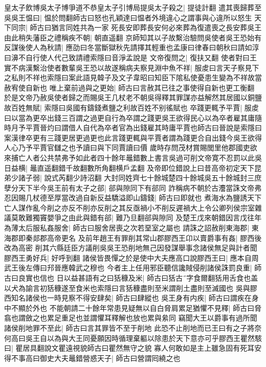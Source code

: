 皇太子飲博吳太子博爭道不恭皇太子引博局提吳太子殺之|{
	提徒計翻}
遣其喪歸葬至吳吳王愠曰|{
	愠於問翻師古曰怒也孔穎達曰愠者外境違心之謂事與心違所以怒生}
天下同宗|{
	師古曰猶言同姓共為一家}
死長安即葬長安何必來葬為復遣喪之長安葬吳王由此稍失藩臣之禮稱疾不朝|{
	朝直遥翻}
京師知其以子故繫治驗問吳使者吳王恐始有反謀後使人為秋請|{
	應劭曰冬當斷獄秋先請擇其輕重也孟康曰律春曰朝秋曰請如淳曰濞不自行使人代己致請禮索隱曰音淨孟說是}
文帝復問之|{
	復扶又翻}
使者對曰王實不病漢繫治使者數輩吳王恐以故遂稱病夫察見淵中魚不祥|{
	服䖍曰言天子察見下之私則不祥也索隱曰案此語見韓子及文子韋昭曰知臣下隂私使憂患生變為不祥故當赦宥使自新也}
唯上棄前過與之更始|{
	師古曰言赦其已往之事使得自新也更工衡翻}
於是文帝乃赦吳使者歸之而賜吳王几杖老不朝吳得釋其罪謀亦益解然其居國以銅鹽故百姓無賦|{
	索隱曰吳國有鑄錢煮鹽之利故百姓不别徭賦也}
卒踐更輒予平賈|{
	服䖍曰以當為更卒出錢三百謂之過更自行為卒謂之踐更吳王欲得民心以為卒者雇其庸隨時月予平賈晉灼曰謂借人自代為卒者官為出錢雇其時庸平賈也師古曰晉說是索隱曰案漢律卒更有三踐更居更過更也此言踐更輒與平賈者謂為踐更合自出錢今吳王欲得人心乃予平賈官讎之也予讀曰與下同賈讀曰價}
歲時存問茂材賞賜閭里他郡國吏欲來捕亡人者公共禁弗予如此者四十餘年鼂錯數上書言吳過可削文帝寛不忍罰以此吳日益横|{
	鼂直遥翻錯千故翻數所角翻横戶孟翻}
及帝即位錯說上曰昔高帝初定天下昆弟少諸子弱|{
	說式芮翻少詩沼翻}
大封同姓齊七十餘城楚四十餘城吳五十餘城封三庶孽分天下半今吳王前有太子之郤|{
	郤與隙同下有郤同}
詐稱病不朝於古灋當誅文帝弗忍因賜几杖德至厚當改過自新反益驕溢即山鑄錢|{
	師古曰即就也}
煮海水為鹽誘天下亡人謀作亂今削之亦反不削亦反削之其反亟禍小不削反遲禍大上令公卿列侯宗室雜議莫敢難獨竇嬰爭之由此與錯有郤|{
	難乃旦翻郤與隙同}
及楚王戊來朝錯因言戊往年為薄太后服私姦服舍|{
	師古曰服舍居喪之次若堊室之屬也}
請誅之詔赦削東海郡|{
	東海郡即秦郯郡高帝更名}
及前年趙王有罪削其常山郡膠西王卬以賣爵事有姦|{
	膠西後改為高密}
削其六縣廷臣方議削吳吳王恐削地無己因發謀舉事念諸侯無足與計者聞膠西王勇好兵|{
	好呼到翻}
諸侯皆畏憚之於是使中大夫應高口說膠西王曰|{
	應本自周武王後左傳曰䢴晉應韓武之穆也}
今者主上任用邪臣聽信讒賊侵削諸侯誅罰良重|{
	師古曰良實也信也}
日以益甚語有之曰狧穅及米|{
	師古曰狧古字食爾翻狧用舌食也盖以犬為諭言初狧穅遂至食米也索隱曰言狧穅盡則至米謂削土盡則至滅國也}
吳與膠西知名諸侯也一時見察不得安肆矣|{
	師古曰肆縱也}
吳王身有内疾|{
	師古曰謂疾在身中不顯於外也}
不能朝請二十餘年常患見疑無以自白脅肩累足猶懼不見釋|{
	師古曰脅翕也謂斂之也累足重足也並謂懼耳釋解也放也累與絫同}
竊聞大王以爵事有過所聞諸侯削地罪不至此|{
	師古曰言其罪皆不至于削地}
此恐不止削地而已王曰有之子將奈何高曰吳王自以為與大王同憂願因時循理棄軀以除患於天下意亦可乎膠西王瞿然駭曰|{
	瞿居具翻說文瞿遠視貌師古曰瞿然無守之貌}
寡人何敢如是主上雖急固有死耳安得不事高曰御史大夫鼂錯營惑天子|{
	師古曰營謂囘繞之也}
